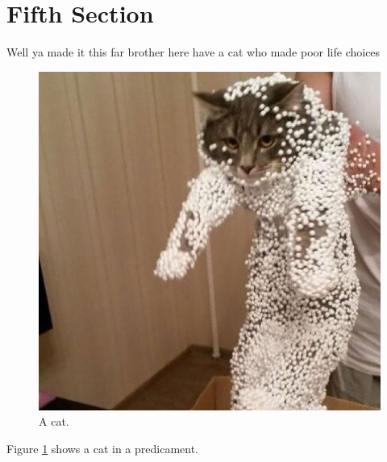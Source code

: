\documentclass{article}
\begin{document}
\section{Fifth Section}
Well ya made it this far brother here have a cat who made poor life choices

\begin{figure}
	\includegraphics[width=\linewidth]{Images/mistake.jpg}
	\caption{A cat.}
  	\label{fig:cat}
\end{figure}

Figure \ref{fig:cat} shows a cat in a predicament.
\end{document}
